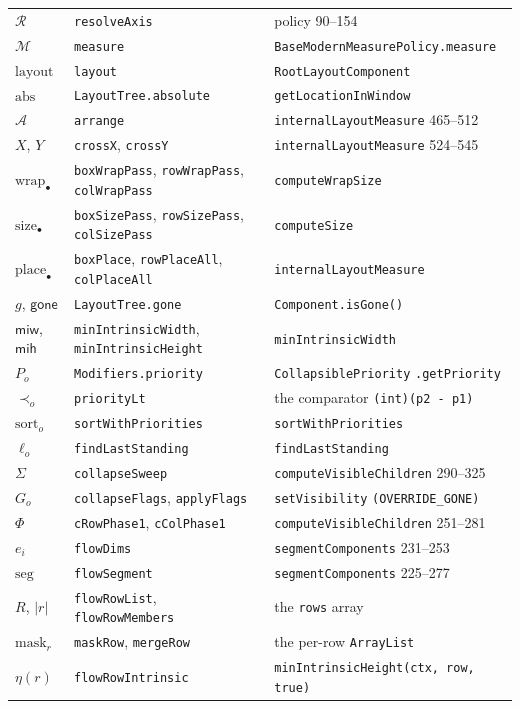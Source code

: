 \documentclass[11pt,a4paper]{article}
\newcommand{\miw}{\mathsf{miw}}
\newcommand{\mih}{\mathsf{mih}}
\newcommand{\gone}{\mathsf{gone}}
\newcommand{\Mm}{\mathcal{M}}          %
\newcommand{\Rr}{\mathcal{R}}          %
\newcommand{\Aa}{\mathcal{A}}          %
\newcommand{\lo}[1]{\texttt{#1}}       %
\newcommand{\jv}[1]{\texttt{#1}}       %
\theoremstyle{definition}
\theoremstyle{plain}
\theoremstyle{remark}
\begin{document}
\begin{center}
\begin{longtable}{@{}
  >{\raggedright\arraybackslash}p{}
  >{\raggedright\arraybackslash}p{}
  >{\raggedright\arraybackslash}p{}@{}}
$\Rr$ & \lo{resolveAxis} & policy 90--154 \\
$\Mm$ & \lo{measure} & \jv{BaseModernMeasurePolicy.measure} \\
$\mathrm{layout}$ & \lo{layout} & \jv{RootLayoutComponent} \\
$\mathrm{abs}$ & \lo{LayoutTree.absolute} & \jv{getLocationInWindow} \\
$\Aa$ & \lo{arrange} & \jv{internalLayoutMeasure} 465--512 \\
$X$, $Y$ & \lo{crossX}, \lo{crossY} & \jv{internalLayoutMeasure} 524--545 \\
$\mathrm{wrap}_\bullet$ & \lo{boxWrapPass}, \lo{rowWrapPass}, \lo{colWrapPass} & \jv{computeWrapSize} \\
$\mathrm{size}_\bullet$ & \lo{boxSizePass}, \lo{rowSizePass}, \lo{colSizePass} & \jv{computeSize} \\
$\mathrm{place}_\bullet$ & \lo{boxPlace}, \lo{rowPlaceAll}, \lo{colPlaceAll} & \jv{internalLayoutMeasure} \\
\midrule
$g$, $\gone$ & \lo{LayoutTree.gone} & \jv{Component.isGone()} \\
$\miw$, $\mih$ & \lo{minIntrinsicWidth}, \lo{minIntrinsicHeight} & \jv{minIntrinsicWidth} \\
$P_o$ & \lo{Modifiers.priority} & \jv{CollapsiblePriority} \newline \jv{.getPriority} \\
$\prec_o$ & \lo{priorityLt} & the comparator \jv{(int)(p2 - p1)} \\
$\mathrm{sort}_o$ & \lo{sortWithPriorities} & \jv{sortWithPriorities} \\
$\ell_o$ & \lo{findLastStanding} & \jv{findLastStanding} \\
$\Sigma$ & \lo{collapseSweep} & \jv{computeVisibleChildren} 290--325 \\
$G_o$ & \lo{collapseFlags}, \lo{applyFlags} & \jv{setVisibility} \newline \jv{(OVERRIDE\_GONE)} \\
$\Phi$ & \lo{cRowPhase1}, \lo{cColPhase1} & \jv{computeVisibleChildren} 251--281 \\
$e_i$ & \lo{flowDims} & \jv{segmentComponents} 231--253 \\
$\mathrm{seg}$ & \lo{flowSegment} & \jv{segmentComponents} 225--277 \\
$R$, $|r|$ & \lo{flowRowList}, \lo{flowRowMembers} & the \jv{rows} array \\
$\mathrm{mask}_r$ & \lo{maskRow}, \lo{mergeRow} & the per-row \jv{ArrayList} \\
$\eta(r)$ & \lo{flowRowIntrinsic} & \jv{minIntrinsicHeight(ctx, row, true)} \\
\bottomrule
\end{longtable}
\end{center}
\end{document}
